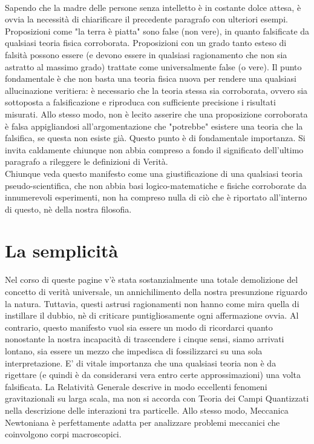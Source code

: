 \documentclass[]{article}
\begin{document}
	\\
	Sapendo che la madre delle persone senza intelletto è in costante dolce attesa, è ovvia la necessità di chiarificare il precedente paragrafo con ulteriori esempi. Proposizioni come "la terra è piatta" sono false (non vere), in quanto falsificate da qualsiasi teoria fisica corroborata. Proposizioni con un grado tanto esteso di falsità possono essere (e devono essere in qualsiasi ragionamento che non sia astratto al massimo grado) trattate come universalmente false (o vere).
	Il punto fondamentale è che non basta una teoria fisica nuova per rendere una qualsiasi allucinazione veritiera: è necessario che la teoria stessa sia corroborata, ovvero sia sottoposta a falsificazione e riproduca con sufficiente precisione i risultati misurati. Allo stesso modo, non è lecito asserire che una proposizione corroborata è falsa appigliandosi all'argomentazione che "potrebbe" esistere una teoria che la falsifica, se questa non esiste già. Questo punto è di fondamentale importanza.		
	Si invita caldamente chiunque non abbia compreso a fondo il significato dell'ultimo paragrafo a rileggere le definizioni di Verità.\\
	Chiunque veda questo manifesto come una giustificazione di una qualsiasi teoria pseudo-scientifica, che non abbia basi logico-matematiche e fisiche corroborate da innumerevoli esperimenti, non ha compreso nulla di ciò che è riportato all'interno di questo, nè della nostra filosofia.
	\section{La semplicità}
	Nel corso di queste pagine v'è stata sostanzialmente una totale demolizione del concetto di verità universale, un annichilimento della nostra presunzione riguardo la natura. Tuttavia, questi astrusi ragionamenti non hanno come mira quella di instillare il dubbio, nè di criticare puntigliosamente ogni affermazione ovvia. Al contrario, questo manifesto vuol sia essere un modo di ricordarci quanto nonostante la nostra incapacità di trascendere i cinque sensi, siamo arrivati lontano, sia essere un mezzo che impedisca di fossilizzarci su una sola interpretazione. E' di vitale importanza che una qualsiasi teoria non è da rigettare (e quindi è da considerarsi vera entro certe approssimazioni) una volta falsificata. La Relatività Generale descrive in modo eccellenti fenomeni gravitazionali su larga scala, ma non si accorda con Teoria dei Campi Quantizzati nella descrizione delle interazioni tra particelle. Allo stesso modo, Meccanica Newtoniana è perfettamente adatta per analizzare problemi meccanici che coinvolgono corpi macroscopici. 
\end{document}
